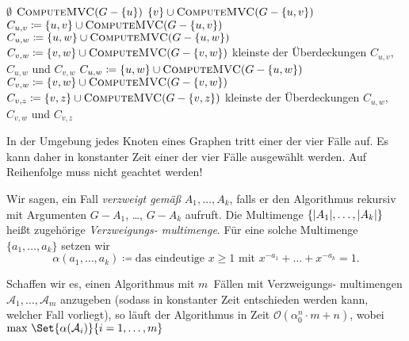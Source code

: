 \documentclass{cheat-sheet}
\newcommand{\size}[1]{\abs{#1}} %
\renewcommand{\O}{\mathcal{O}} %
\begin{document}
\begin{algorithmic}
     \Return $\emptyset$ \EndIf
      \State \Return $\Call{ComputeMVC}{G - \{ u \}}$
    \EndIf
      \State \Return $\{ v \} \cup \Call{ComputeMVC}{G - \{ u, v \}}$
    \EndIf
      \State $C_{u,v} \coloneqq \{u, v\} \cup \Call{ComputeMVC}{G - \{ u, v \}}$
      \State $C_{u,w} \coloneqq \{u, w\} \cup \Call{ComputeMVC}{G - \{ u, w \}}$
      \State $C_{v,w} \coloneqq \{v, w\} \cup \Call{ComputeMVC}{G - \{ v, w \}}$
      \State \Return kleinste der Überdeckungen $C_{u,v}$, $C_{u,w}$ und $C_{v,w}$
    \EndIf
      \State $C_{u,w} \coloneqq \{u, w\} \cup \Call{ComputeMVC}{G - \{ u, w \}}$
      \State $C_{v,w} \coloneqq \{v, w\} \cup \Call{ComputeMVC}{G - \{ v, w \}}$
      \State $C_{v,z} \coloneqq \{v, z\} \cup \Call{ComputeMVC}{G - \{ v, z \}}$
      \State \Return kleinste der Überdeckungen $C_{u,w}$, $C_{v,w}$ und $C_{v,z}$
    \EndIf
  \EndFunction
\end{algorithmic}

\begin{samepage}

\begin{bem}
  In der Umgebung jedes Knoten eines Graphen tritt einer der vier Fälle auf.
  Es kann daher in konstanter Zeit einer der vier Fälle ausgewählt werden.
  Auf Reihenfolge muss nicht geachtet werden!
\end{bem}

Wir sagen, ein Fall \textit{verzweigt gemäß} $A_1, \ldots, A_k$, falls er den Algorithmus rekursiv mit Argumenten $G - A_1$, \ldots, $G - A_k$ aufruft.
Die Multimenge $\{ \size{A_1}, \ldots, \size{A_k} \}$ heißt zugehörige \textit{Verzweigungs- multimenge}.
Für eine solche Multimenge $\{ a_1, \ldots, a_k \}$ setzen wir
\[ \alpha(a_1, \ldots, a_k) \coloneqq \text{das eindeutige $x \geq 1$ mit } x^{-a_1} + \ldots + x^{-a_k} = 1. \]

\end{samepage}

Schaffen wir es, einen Algorithmus mit $m$~Fällen mit Verzweigungs- multimengen $\mathcal{A}_1, \ldots, \mathcal{A}_m$ anzugeben (sodass in konstanter Zeit entschieden werden kann, welcher Fall vorliegt), so läuft der Algorithmus in Zeit $\O(\alpha_0^n \cdot m + n)$, wobei $\max \, \Set{\alpha(\mathcal{A}_i)}{i = 1, \ldots, m}$
\end{document}
